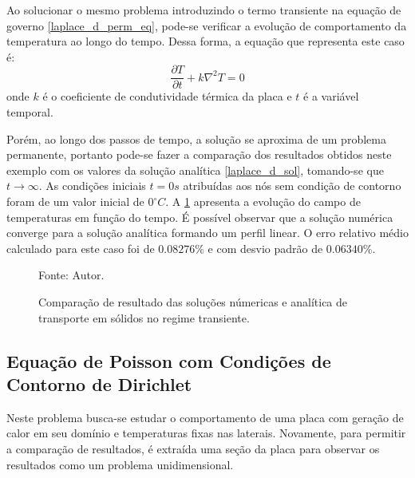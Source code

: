 Ao solucionar o mesmo problema introduzindo o termo transiente na equação de governo \ref{laplace_d_perm_eq}, pode-se verificar a evolução de comportamento da temperatura ao longo do tempo.
Dessa forma, a equação que representa este caso é:
\begin{equation}
    \dfrac{\partial T}{\partial t} + k\nabla^2 T = 0
    \label{laplace_d_trans_eq} 
\end{equation}
onde $k$ é o coeficiente de condutividade térmica da placa e $t$ é a variável temporal.

Porém, ao longo dos passos de tempo, a solução se aproxima de um problema permanente, portanto pode-se fazer a comparação dos resultados obtidos neste exemplo com os valores da solução analítica \eqref{laplace_d_sol}, tomando-se que $t\rightarrow \infty$.
As condições iniciais $t=0s$ atribuídas aos nós sem condição de contorno foram de um valor inicial de $0^{\circ}C$.
A \ref{laplace_d_trans_comp} apresenta a evolução do campo de temperaturas em função do tempo.
É possível observar que a solução numérica converge para a solução analítica formando um perfil linear.
O erro relativo médio calculado para este caso foi de $0.08276\%$ e com desvio padrão de $0.06340\%$.
\begin{figure}[H]
    \centering
     {\raggedleft \scriptsize Fonte: Autor.}
    \caption{Comparação de resultado das soluções númericas e analítica de transporte em sólidos no regime transiente.}
    \label{laplace_d_trans_comp}
\end{figure}


\subsection{\textbf{Equação de Poisson com Condições de Contorno de Dirichlet}}
\label{sec_poisson_dir}
Neste problema busca-se estudar o comportamento de uma placa com geração de calor em seu domínio e temperaturas fixas nas laterais.
Novamente, para permitir a comparação de resultados, é extraída uma seção da placa para observar os resultados como um problema unidimensional.

